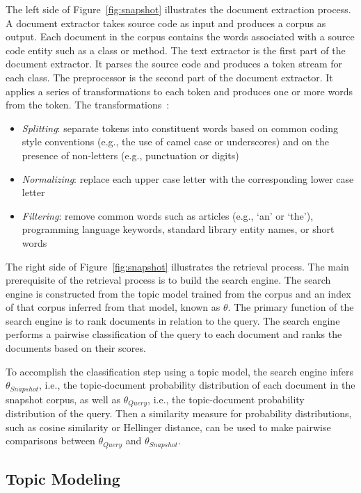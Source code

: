 The left side of Figure~\ref{fig:snapshot} illustrates the document extraction process.
A document extractor takes source code as input and produces a corpus as output.
Each document in the corpus contains the words associated with a source code entity
such as a class or method.
The text extractor is the first part of the document extractor.
It parses the source code and produces a token stream for each class.
The preprocessor is the second part of the document extractor.
It applies a series of transformations to each token and
produces one or more words from the token.
The transformations~\cite{Marcus-etal:2004,Marcus-Menzies:2010}: %
\begin{itemize}
    \item {\it Splitting}: separate tokens into constituent words
        based on common coding style conventions (e.g., the use of camel case or underscores)
        and on the presence of non-letters (e.g., punctuation or digits)
    \item {\it Normalizing}: replace each upper case letter with the corresponding lower case letter
    \item {\it Filtering}: remove common words such as articles (e.g., `an' or `the'),
        programming language keywords, standard library entity names, or short words
\end{itemize}

The right side of Figure~\ref{fig:snapshot} illustrates the retrieval process.
The main prerequisite of the retrieval process is to build the search engine.
The search engine is constructed from the topic model trained from the corpus
and an index of that corpus inferred from that model, known as $\theta$.
The primary function of the search engine is to rank documents in relation to the query.
The search engine performs a pairwise classification of the query
to each document and ranks the documents based on their scores.

To accomplish the classification step using a topic model,
the search engine infers $\theta_{Snapshot}$, i.e.,
the topic-document probability distribution of each document in the snapshot corpus,
as well as $\theta_{Query}$, i.e., the topic-document probability distribution of the query.
Then a similarity measure for probability distributions, such as
cosine similarity or Hellinger distance, can be used to make pairwise comparisons
between $\theta_{Query}$ and $\theta_{Snapshot}$.

\subsection{Topic Modeling}

